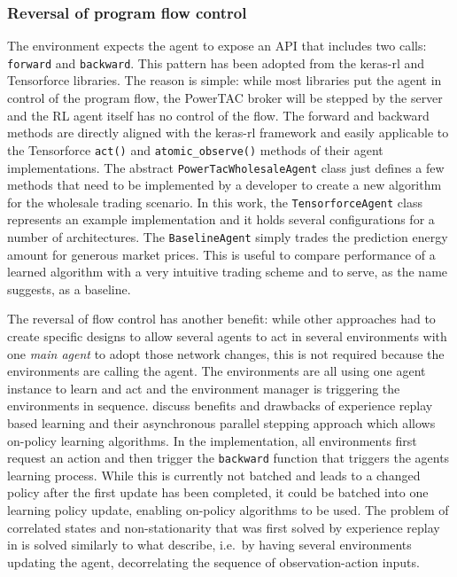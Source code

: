 \subsubsection{Reversal of program flow control}%
\label{sub:reversal_of_flow_control}

The environment expects the agent to expose an \ac{API} that includes two calls: \texttt{forward} and
\texttt{backward}. This pattern has been adopted from the keras-rl and Tensorforce libraries. The reason is simple:
while most libraries put the agent in control of the program flow, the \ac{PowerTAC} broker will be stepped by the
server and the \ac{RL} agent itself has no control of the flow. The forward and backward methods are
directly aligned with the keras-rl framework and easily applicable to the Tensorforce \texttt{act()} and
\texttt{atomic\_observe()} methods of their agent implementations. The abstract \texttt{PowerTacWholesaleAgent} class just defines a
few methods that need to be implemented by a developer to create a new algorithm for the wholesale trading
scenario. In this work, the \texttt{TensorforceAgent} class represents an example implementation and it holds several
configurations for a number of architectures. The \texttt{BaselineAgent} simply trades the prediction
energy amount for generous market prices. This is useful to compare performance of a learned algorithm with a very
intuitive trading scheme and to serve, as the name suggests, as a baseline.

The reversal of flow control has another benefit: while other approaches had to create specific designs to allow 
several agents to act in several environments with one \emph{main agent} to adopt those network changes, this is not
required because the environments are calling the agent. The environments are all using one agent instance to learn and
act and the environment manager is triggering the environments in sequence. \citet{mnih2016asynchronous} discuss 
benefits and drawbacks of experience replay based learning and their asynchronous parallel stepping approach which
allows on-policy learning algorithms. In the implementation, all environments first request an action and then trigger
the \texttt{backward} function that triggers the agents learning process. While this is currently not batched and
leads to a changed policy after the first update has been completed, it could be batched into
one learning policy update, enabling on-policy algorithms to be used. The problem of correlated states and
non-stationarity that was first solved by experience replay in \cite[]{mnih2013playing} is solved similarly to what
\citet{mnih2016asynchronous} describe, i.e.\ by having several environments updating the agent, decorrelating the
sequence of observation-action inputs.

